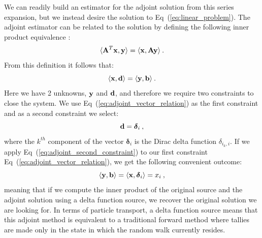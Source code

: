 \documentclass[letterpaper,12pt]{article}
\begin{document}
We can readily build an estimator for the adjoint solution from this
series expansion, but we instead desire the solution to
Eq~(\ref{eq:linear_problem}). The adjoint estimator can be related to
the solution by defining the following inner product equivalence
\cite{spanier_monte_1969}:
\begin{equation}
  \langle \mathbf{A}^T \mathbf{x}, \mathbf{y} \rangle = \langle \mathbf{x}, \mathbf{A}
  \mathbf{y} \rangle\:.
  \label{eq:adjoint_operator_product}
\end{equation}
From this definition it follows that:
\begin{equation}
  \langle \mathbf{x}, \mathbf{d} \rangle = \langle \mathbf{y}, \mathbf{b} \rangle\:.
  \label{eq:adjoint_vector_relation}
\end{equation}
Here we have 2 unknowns, $\mathbf{y}$ and $\mathbf{d}$, and therefore we
require two constraints to close the system. We use
Eq~(\ref{eq:adjoint_vector_relation}) as the first constraint and as a
second constraint we select:
\begin{equation}
  \mathbf{d} = \boldsymbol{\delta}_i\:,
  \label{eq:adjoint_second_constraint}
\end{equation}
where the $k^{th}$ component of the vector $\boldsymbol{\delta}_i$ is
the Dirac delta function $\delta_{i_k,i}$. If we apply
Eq~(\ref{eq:adjoint_second_constraint}) to our first constraint
Eq~(\ref{eq:adjoint_vector_relation}), we get the following convenient
outcome:
\begin{equation}
  \langle \mathbf{y}, \mathbf{b} \rangle = \langle \mathbf{x},
  \boldsymbol{\delta}_i \rangle = x_i \:,
  \label{eq:inner_product_constraint}
\end{equation}
meaning that if we compute the inner product of the original source and
the adjoint solution using a delta function source, we recover the
original solution we are looking for. In terms of particle transport, a
delta function source means that this adjoint method is equivalent to
a traditional forward method where tallies are made only in the state
in which the random walk currently resides.
\end{document}
